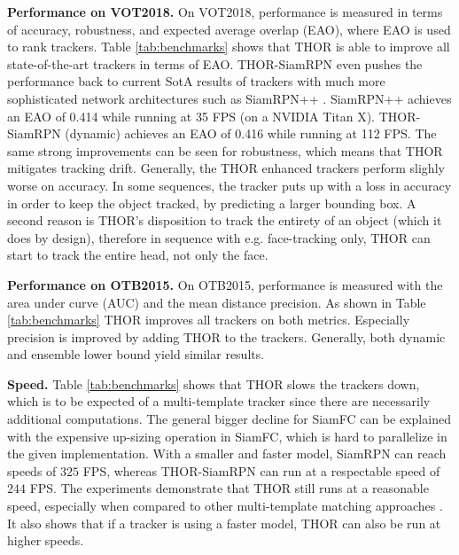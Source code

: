 \documentclass{article}
\begin{document}
\textbf{Performance on VOT2018.}
On VOT2018, performance is measured in terms of accuracy, robustness, and expected average overlap (EAO), where EAO is used to rank trackers. 
Table \ref{tab:benchmarks} shows that THOR is able to improve all state-of-the-art trackers in terms of EAO. THOR-SiamRPN even pushes the performance back to current SotA results of trackers with much more sophisticated network architectures such as SiamRPN++ \cite{li2019siamrpnpp}. SiamRPN++ achieves an EAO of 0.414 while running at 35 FPS (on a NVIDIA Titan X). THOR-SiamRPN (dynamic) achieves an EAO of 0.416 while running at 112 FPS.
The same strong improvements can be seen for robustness, which means that THOR mitigates tracking drift. 
Generally, the THOR enhanced trackers perform slighly worse on accuracy. 
In some sequences, the tracker puts up with a loss in accuracy in order to keep the object tracked, by predicting a larger bounding box. A second reason is THOR's disposition to track the entirety of an object (which it does by design), therefore in sequence with e.g. face-tracking only, THOR can start to track the entire head, not only the face. 

 
\textbf{Performance on OTB2015.}
On OTB2015, performance is measured with the area under curve (AUC) and the mean distance precision. As shown in Table \ref{tab:benchmarks} THOR improves all trackers on both metrics. Especially precision is improved by adding THOR to the trackers. Generally, both dynamic and ensemble lower bound yield similar results.

\textbf{Speed.} 
Table \ref{tab:benchmarks} shows that THOR slows the trackers down, which is to be expected of a multi-template tracker since there are necessarily additional computations. The general bigger decline for SiamFC can be explained with the expensive up-sizing operation in SiamFC, which is hard to parallelize in the given implementation. With a smaller and faster model, SiamRPN can reach speeds of $325$ FPS, whereas THOR-SiamRPN can run at a respectable speed of $244$ FPS. The experiments demonstrate that THOR still runs at a reasonable speed, especially when compared to other multi-template matching approaches \cite{lee2018memory,yang2018learning}. It also shows that if a tracker is using a faster model, THOR can also be run at higher speeds.
\end{document}
